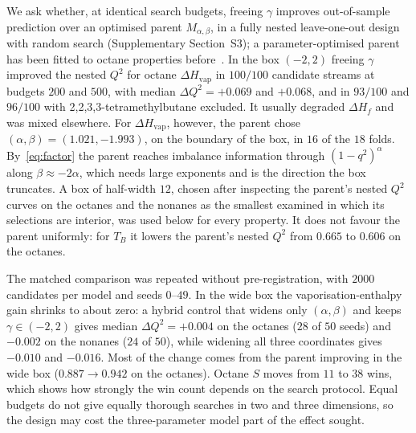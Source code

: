 We ask whether, at identical search budgets, freeing $\gamma$ improves
out-of-sample prediction over an optimised parent $M_{\alpha,\beta}$, in a
fully nested leave-one-out design with random search (Supplementary
Section~S3); a parameter-optimised parent has been fitted to octane
properties before~\cite{AliGutmanFurtulaAlbalahiHamza2025}. In the box
$(-2,2)$ freeing $\gamma$ improved the nested $Q^2$ for octane
$\Delta H_{\mathrm{vap}}$ in $100/100$ candidate streams at budgets $200$
and $500$, with median $\Delta Q^2 = +0.069$ and $+0.068$, and in $93/100$
and $96/100$ with 2,2,3,3-tetramethylbutane excluded. It usually degraded
$\Delta H_f$ and was mixed elsewhere. For $\Delta H_{\mathrm{vap}}$, however,
the parent chose $(\alpha,\beta) = (1.021, -1.993)$, on the boundary of the
box, in $16$ of the $18$ folds. By~\eqref{eq:factor} the parent reaches
imbalance information through $(1-q^2)^{\alpha}$ along
$\beta \approx -2\alpha$, which needs large exponents and is the direction
the box truncates. A box of half-width $12$, chosen after inspecting the
parent's nested $Q^2$ curves on the octanes and the nonanes as the
smallest examined in which its selections are interior, was used below for
every property. It does not favour the parent uniformly: for $T_B$ it
lowers the parent's nested $Q^2$ from $0.665$ to $0.606$ on the octanes.

The matched comparison was repeated without pre-registration, with
$2000$ candidates per model and seeds $0$--$49$. In the wide box the
vaporisation-enthalpy gain shrinks to about zero: a hybrid control that
widens only $(\alpha,\beta)$ and keeps $\gamma \in (-2,2)$ gives median
$\Delta Q^2 = +0.004$ on the octanes ($28$ of $50$ seeds) and $-0.002$ on
the nonanes ($24$ of $50$), while widening all three coordinates gives
$-0.010$ and $-0.016$. Most of the change comes from the parent improving
in the wide box ($0.887 \to 0.942$ on the octanes). Octane $S$ moves from
$11$ to $38$ wins, which shows how strongly the win count depends on the
search protocol. Equal budgets do not give equally thorough searches in
two and three dimensions, so the design may cost the three-parameter
model part of the effect sought.


